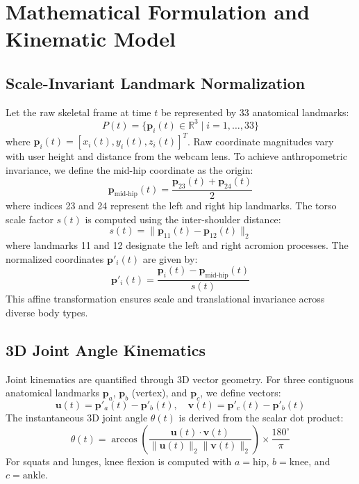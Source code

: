 \documentclass[conference]{IEEEtran}
\begin{document}
\section{Mathematical Formulation and Kinematic Model}

\subsection{Scale-Invariant Landmark Normalization}
Let the raw skeletal frame at time $t$ be represented by 33 anatomical landmarks:
\begin{equation}
    P(t) = \{\mathbf{p}_i(t) \in \mathbb{R}^3 \mid i = 1, \dots, 33\}
\end{equation}
where $\mathbf{p}_i(t) = [x_i(t), y_i(t), z_i(t)]^T$. Raw coordinate magnitudes vary with user height and distance from the webcam lens. To achieve anthropometric invariance, we define the mid-hip coordinate as the origin:
\begin{equation}
    \mathbf{p}_{\text{mid-hip}}(t) = \frac{\mathbf{p}_{23}(t) + \mathbf{p}_{24}(t)}{2}
\end{equation}
where indices 23 and 24 represent the left and right hip landmarks. The torso scale factor $s(t)$ is computed using the inter-shoulder distance:
\begin{equation}
    s(t) = \|\mathbf{p}_{11}(t) - \mathbf{p}_{12}(t)\|_2
\end{equation}
where landmarks 11 and 12 designate the left and right acromion processes. The normalized coordinates $\mathbf{p}'_i(t)$ are given by:
\begin{equation}
    \mathbf{p}'_i(t) = \frac{\mathbf{p}_i(t) - \mathbf{p}_{\text{mid-hip}}(t)}{s(t)}
\end{equation}
This affine transformation ensures scale and translational invariance across diverse body types.

\subsection{3D Joint Angle Kinematics}
Joint kinematics are quantified through 3D vector geometry. For three contiguous anatomical landmarks $\mathbf{p}_a$, $\mathbf{p}_b$ (vertex), and $\mathbf{p}_c$, we define vectors:
\begin{equation}
    \mathbf{u}(t) = \mathbf{p}'_a(t) - \mathbf{p}'_b(t), \quad \mathbf{v}(t) = \mathbf{p}'_c(t) - \mathbf{p}'_b(t)
\end{equation}
The instantaneous 3D joint angle $\theta(t)$ is derived from the scalar dot product:
\begin{equation}
    \theta(t) = \arccos\left(\frac{\mathbf{u}(t) \cdot \mathbf{v}(t)}{\|\mathbf{u}(t)\|_2 \|\mathbf{v}(t)\|_2}\right) \times \frac{180^\circ}{\pi}
\end{equation}
For squats and lunges, knee flexion is computed with $a = \text{hip}$, $b = \text{knee}$, and $c = \text{ankle}$.
\end{document}
